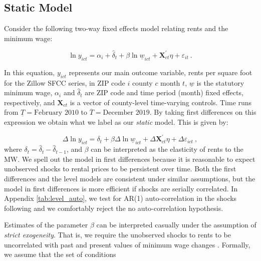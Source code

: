 \subsection{Static Model}
Consider the following two-way fixed effects model relating rents and the minimum wage:

\begin{equation*} \label{eq:did_lev}
    \ln y_{ict} = \alpha_i + \hat{\delta}_t 
    			+ \beta \ln \underline{w}_{ict}
    			+ \mathbf{X}^{'}_{ct}\eta
    			+ \varepsilon_{it} \ .
\end{equation*}    

In this equation, $y_{ict}$ represents our main outcome variable, rents per square foot 
for the Zillow SFCC series, in ZIP code $i$ county $c$ month $t$, $\underline{w}$ is the 
statutory minimum wage, $\alpha_i$ and $\hat{\delta}_t$ are ZIP code and time period 
(month) fixed effects, respectively, and $\mathbf{X}_{ct}$ is a vector of county-level 
time-varying controls. Time runs from $\underline{T} = \text{February 2010}$ to 
$\overline{T} = \text{December 2019}$. By taking first differences on this expression 
we obtain what we label as our \textit{static} model. This is given by:

\begin{equation}\label{eq:did}
	\Delta \ln y_{ict} = \delta_t
						+ \beta \Delta \ln \underline{w}_{ict}
						+ \Delta \mathbf{X}^{'}_{ct} \eta
						+ \Delta \varepsilon_{ict} \ ,
\end{equation}
where $\delta_t = \hat{\delta}_t - \hat{\delta}_{t-1}$, and $\beta$ can be interpreted 
as the elasticity of rents to the MW. We spell out the model in first differences because 
it is reasonable to expect unobserved shocks to rental prices to be persistent over 
time. Both the first differences and the level models are consistent under similar 
assumptions, but the model in first differences is more efficient if shocks are serially 
correlated. In Appendix \autoref{tab:level_auto}, we test for AR(1) auto-correlation in 
the shocks following \textcite[][chapter 10]{wooldridge2010} and we comfortably reject 
the no auto-correlation hypothesis. 

Estimates of the parameter $\beta$ can be interpreted casually under the assumption of
\textit{strict exogeneity}. That is, we require the unobserved shocks to rents to be 
uncorrelated with past and present values of minimum wage changes 
\parencite[][chapter 10]{wooldridge2010}. Formally, we assume that the set of conditions

